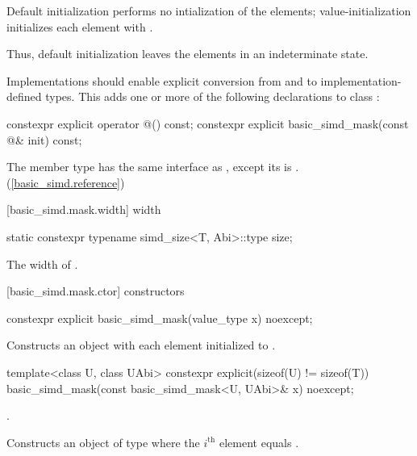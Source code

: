 \pnum
Default initialization performs no intialization of the elements; value-initialization initializes each element with . \begin{note}Thus, default initialization leaves the elements in an indeterminate state.\end{note}

\pnum
Implementations should enable explicit conversion from and to implementation-defined types. This adds one or more of the following declarations to class :

\begin{codeblock}
constexpr explicit operator @\impdef@() const;
constexpr explicit basic_simd_mask(const @\impdef@& init) const;
\end{codeblock}

\pnum
The member type  has the same interface as , except its  is . (\ref{basic_simd.reference})

[basic_simd.mask.width]{ width}

\begin{itemdecl}
static constexpr typename simd_size<T, Abi>::type size;
\end{itemdecl}

\begin{itemdescr}
  \pnum\returns
  The width of .
\end{itemdescr}

[basic_simd.mask.ctor]{ constructors}

\begin{itemdecl}
constexpr explicit basic_simd_mask(value_type x) noexcept;
\end{itemdecl}

\begin{itemdescr}
  \pnum\effects
  Constructs an object with each element initialized to .
\end{itemdescr}

\begin{itemdecl}
template<class U, class UAbi>
  constexpr explicit(sizeof(U) != sizeof(T)) basic_simd_mask(const basic_simd_mask<U, UAbi>& x) noexcept;
\end{itemdecl}

\begin{itemdescr}
  \pnum\constraints
  .

  \pnum\effects
  Constructs an object of type  where the $i^\text{th}$ element equals  \foralli.
\end{itemdescr}

